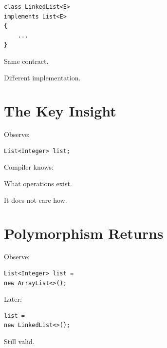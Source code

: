 \documentclass[11pt,a4paper]{book}
\begin{document}
\begin{verbatim} 
class LinkedList<E>
implements List<E>
{
    ...
}
\end{verbatim}


Same contract.


Different implementation.


\section{The Key Insight}

Observe:

\begin{verbatim} 
List<Integer> list;
\end{verbatim}


Compiler knows:


What operations exist.


It does not care how.


\section{Polymorphism Returns}

Observe:

\begin{verbatim} 
List<Integer> list =
new ArrayList<>();
\end{verbatim}


Later:

\begin{verbatim} 
list =
new LinkedList<>();
\end{verbatim}


Still valid.
\end{document}
